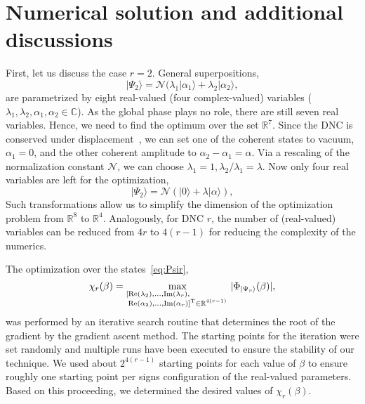 \documentclass[aps,pra,twocolumn,showpacs,superscriptaddress,10pt]{revtex4-1}
\begin{document}
\section{Numerical solution and additional discussions}\label{appNum}
	First, let us discuss the case $r=2$.
	General superpositions,
	\begin{equation}
		|\Psi_{2}\rangle=\mathcal{N}(\lambda_{1}|\alpha_{1}\rangle+\lambda_{2}|\alpha_{2}\rangle,\label{eq:C1}
	\end{equation}
	are parametrized by eight real-valued (four complex-valued) variables ($\lambda_1,\lambda_2,\alpha_1,\alpha_2\in\mathbb C$).
	As the global phase plays no role, there are still seven real variables.
	Hence, we need to find the optimum over the set $\mathbb{R}^7$.
	Since the DNC is conserved under displacement~\cite{Vogel2014}, we can set one of the coherent states to vacuum, $\alpha_{1}=0$, and the other coherent amplitude to $\alpha_{2}-\alpha_{1}=\alpha$.
	Via a rescaling of the normalization constant $\mathcal{N}$, we can choose $\lambda_{1}=1,\lambda_{2}/\lambda_{1}=\lambda$.
	Now only four real variables are left for the optimization,
	\begin{equation}
		|\Psi_{2}\rangle=\mathcal{N}(|0\rangle+\lambda|\alpha\rangle),\label{eq:C2}
	\end{equation}
	Such transformations allow us to simplify the dimension of the optimization problem from $\mathbb{R}^8$ to $\mathbb{R}^4$.
	Analogously, for DNC $r$, the number of (real-valued) variables can be reduced from $4r$ to $4(r-1)$ for reducing the complexity of the numerics.

 	The optimization over the states~\eqref{eq:Psir},
 	\begin{equation}
		\chi_{r}(\beta)=\max\limits_{\substack{[{\rm Re}(\lambda_2),\dots,{\rm Im}(\lambda_r),\qquad\qquad\\{\rm Re}(\alpha_2),\dots,{\rm Im}(\alpha_r)]^{\rm T}\in\mathbb{R}^{4(r-1)}}}|\Phi_{|\Psi_r\rangle}(\beta)|,
 	\end{equation}
 	was performed by an iterative search routine that determines the root of the gradient by the gradient ascent method.
 	The starting points for the iteration were set randomly and multiple runs have been executed to ensure the stability of our technique.
 	We used about $2^{4(r-1)}$ starting points for each value of $\beta$ to ensure roughly one starting point per signs configuration of the real-valued parameters.
	Based on this proceeding, we determined the desired values of $\chi_{r}(\beta)$.
\end{document}
